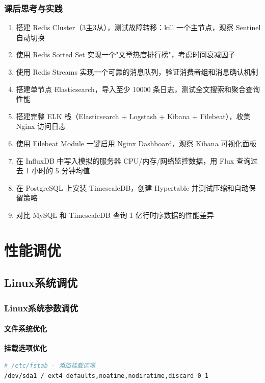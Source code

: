 \documentclass[12pt,UTF8]{ctexbook}
\begin{document}
\section{课后思考与实践}
\label{sec:db-advanced-practice}
\begin{enumerate}
    \item 搭建 Redis Cluster（3主3从），测试故障转移：kill 一个主节点，观察 Sentinel 自动切换
    \item 使用 Redis Sorted Set 实现一个"文章热度排行榜"，考虑时间衰减因子
    \item 使用 Redis Streams 实现一个可靠的消息队列，验证消费者组和消息确认机制
    \item 搭建单节点 Elasticsearch，导入至少 10000 条日志，测试全文搜索和聚合查询性能
    \item 搭建完整 ELK 栈（Elasticsearch + Logstash + Kibana + Filebeat），收集 Nginx 访问日志
    \item 使用 Filebeat Module 一键启用 Nginx Dashboard，观察 Kibana 可视化面板
    \item 在 InfluxDB 中写入模拟的服务器 CPU/内存/网络监控数据，用 Flux 查询过去 1 小时的 5 分钟均值
    \item 在 PostgreSQL 上安装 TimescaleDB，创建 Hypertable 并测试压缩和自动保留策略
    \item 对比 MySQL 和 TimescaleDB 查询 1 亿行时序数据的性能差异
\end{enumerate}

\part{性能调优}

\chapter{Linux系统调优}
\label{chap:linux-tuning}

\section{Linux系统参数调优}
\label{sec:system-tuning}

\subsection*{文件系统优化}

\textbf{挂载选项优化}
\begin{lstlisting}[language=bash]
# /etc/fstab - 添加挂载选项
/dev/sda1 / ext4 defaults,noatime,nodiratime,discard 0 1
\end{lstlisting}
\end{document}
